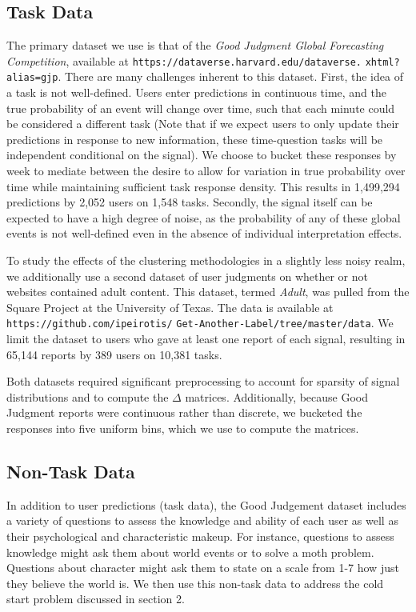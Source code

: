\documentclass{article}
\begin{document}
\subsection{Task Data}
The primary dataset we use is that of the \emph{Good Judgment Global Forecasting Competition}, available at \texttt{https://dataverse.harvard.edu/dataverse.}
\texttt{xhtml?alias=gjp}. There are many challenges inherent to this dataset. First, the idea of a task is not well-defined. Users enter predictions in continuous time, and the true probability of an event will change over time, such that each minute could be considered a different task (Note that if we expect users to only update their predictions in response to new information, these time-question tasks will be independent conditional on the signal). We choose to bucket these responses by week to mediate between the desire to allow for variation in true probability over time while maintaining sufficient task response density. This results in 1,499,294 predictions by 2,052 users on 1,548 tasks. Secondly, the signal itself can be expected to have a high degree of noise, as the probability of any of these global events is not well-defined even in the absence of individual interpretation effects. 

To study the effects of the clustering methodologies in a slightly less noisy realm, we additionally use a second dataset of user judgments on whether or not websites contained adult content. This dataset, termed \emph{Adult}, was pulled from the Square Project at the University of Texas. The data is available at \texttt{https://github.com/ipeirotis/}
\texttt{Get-Another-Label/tree/master/data}. We limit the dataset to users who gave at least one report of each signal, resulting in 65,144 reports by 389 users on 10,381 tasks.

Both datasets required significant preprocessing to account for sparsity of signal distributions and to compute the $\Delta$ matrices. Additionally, because Good Judgment reports were continuous rather than discrete, we bucketed the responses into five uniform bins, which we use to compute the matrices.

\subsection{Non-Task Data}
In addition to user predictions (task data), the Good Judgement dataset includes a variety of questions to assess the knowledge and ability of each user as well as their psychological and characteristic makeup. For instance, questions to assess knowledge might ask them about world events or to solve a moth problem. Questions about character might ask them to state on a scale from 1-7 how just they believe the world is. We then use this non-task data to address the cold start problem discussed in section 2. 
\end{document}
